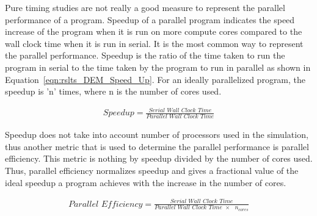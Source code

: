 \documentclass[preprint,11pt,authoryear]{elsarticle}
\begin{document}
Pure timing studies are not really a good measure to represent the parallel performance of a program. 
Speedup of a parallel program indicates the speed increase of the program when it is run on more 
compute cores compared to the wall clock time when it is run in serial. It is the most common way to 
represent the parallel performance. Speedup is the ratio of the time taken to run the program in serial 
to the time taken by the program to run in parallel as shown in Equation~\ref{eqn:rslts_DEM_Speed_Up}. 
For an ideally parallelized program, the speedup is 'n' times, where n is the number of cores used.

\begin{align}
\textit{Speedup} = \frac{\textit{Serial Wall Clock Time}}{\textit{Parallel Wall Clock Time}}
\label{eqn:rslts_DEM_Speed_Up}
\end{align}

Speedup does not take into account number of processors used in the simulation, thus another metric 
that is used to determine the parallel performance is parallel efficiency. This metric is nothing by 
speedup divided by the number of cores used. Thus, parallel efficiency normalizes speedup and gives 
a fractional value of the ideal speedup a program achieves with the increase in the number of cores.

\begin{align}
\textit{Parallel Efficiency} = \frac{\textit{Serial Wall Clock Time}}{\textit{Parallel Wall Clock Time $\times$ $n_{cores}$}}
\label{eqn:rslts_DEM_parallel_efficiency}
\end{align}
\end{document}
